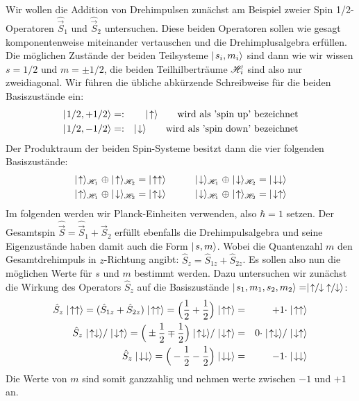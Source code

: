 Wir wollen die Addition von Drehimpulsen zunächst am Beispiel zweier Spin 1/2-Operatoren $\hat{\vec{S}}_1$ und $\hat{\vec{S}}_2$ untersuchen. Diese beiden Operatoren sollen wie gesagt komponentenweise miteinander vertauschen und die Drehimplusalgebra erfüllen. Die möglichen Zustände der beiden Teilsysteme $\mid\!\!\!\,\,{s_i,m_i}\rangle$ sind dann wie wir wissen $s = 1/2$ und $m = \pm 1/2$, die beiden Teilhilberträume $\mathscr H_i$ sind also nur zweidiagonal. Wir führen die übliche abkürzende Schreibweise für die beiden Basiszustände ein: 
\begin{eqnarray*}
	\ket{1/2,+1/2} &=:& \up \qquad\text{wird als 'spin up' bezeichnet}
	\\
	\ket{1/2,-1/2} &=:& \down \qquad\text{wird als 'spin down' bezeichnet}
\end{eqnarray*}
Der Produktraum der beiden Spin-Systeme besitzt dann die vier folgenden Basiszustände:
\begin{eqnarray*}
	\up_{\hil_1}\;\oplus\up_{\hil_2} =\;\upup &\qquad& \down_{\hil_1}\;\oplus\down_{\hil_2} =\;\downdown
	\\
	\up_{\hil_1}\;\oplus\down_{\hil_2} =\;\updown &\qquad& \down_{\hil_1}\;\oplus\up_{\hil_2} =\;\downup
\end{eqnarray*}
Im folgenden werden wir Planck-Einheiten verwenden, also $\hbar=1$ setzen. Der Gesamtspin $\hat{\vec{S}}=\hat{\vec{S}}_1 + \hat{\vec{S}}_2$ erfüllt ebenfalls die Drehimpulsalgebra und seine Eigenzustände haben damit auch die Form $\mid\!\!\!\,\,{s,m}\rangle$. Wobei die Quantenzahl $m$ den Gesamtdrehimpuls in $z$-Richtung angibt: $\hat{S}_z = \hat{S}_{1z} + \hat{S}_{2z}$. Es sollen also nun die möglichen Werte für $s$ und $m$ bestimmt werden. Dazu untersuchen wir zunächst die Wirkung des Operators $\hat{S}_z$ auf die Basiszustände $\ket{s_1,m_1,s_2,m_2}=\ket{\uparrow\!\!/\!\!\downarrow\;\uparrow\!\!/\!\!\downarrow}$: 
\begin{eqnarray*}
	\hat{S}_z \upup = (\hat{S}_{1z} + \hat{S}_{2z})\upup = \Big(\frac12+\frac12\Big)\upup &=& +1\cdot\upup
	\\
	\hat{S}_z \updown/\downup = \Big(\pm\frac12\mp\frac12\Big)\updown/\downup &=& 0\cdot\updown/\downup
	\\
	\hat{S}_z \downdown = \Big(-\frac12-\frac12\Big)\downdown &=& -1\cdot\downdown 
\end{eqnarray*}
Die Werte von $m$ sind somit ganzzahlig und nehmen werte zwischen $-1$ und $+1$ an.

